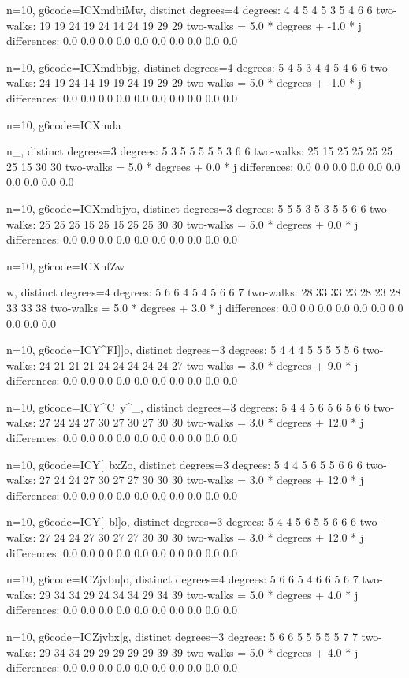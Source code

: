 {{{{{{{{{{{{n=10, g6code=ICXmdbiMw, distinct degrees=4
degrees: 4 4 5 4 5 3 5 4 6 6 
two-walks: 19 19 24 19 24 14 24 19 29 29 
two-walks = 5.0 * degrees + -1.0 * j
differences: 0.0 0.0 0.0 0.0 0.0 0.0 0.0 0.0 0.0 0.0 

n=10, g6code=ICXmdbbjg, distinct degrees=4
degrees: 5 4 5 3 4 4 5 4 6 6 
two-walks: 24 19 24 14 19 19 24 19 29 29 
two-walks = 5.0 * degrees + -1.0 * j
differences: 0.0 0.0 0.0 0.0 0.0 0.0 0.0 0.0 0.0 0.0 

n=10, g6code=ICXmda}n_, distinct degrees=3
degrees: 5 3 5 5 5 5 5 3 6 6 
two-walks: 25 15 25 25 25 25 25 15 30 30 
two-walks = 5.0 * degrees + 0.0 * j
differences: 0.0 0.0 0.0 0.0 0.0 0.0 0.0 0.0 0.0 0.0 

n=10, g6code=ICXmdbjyo, distinct degrees=3
degrees: 5 5 5 3 5 3 5 5 6 6 
two-walks: 25 25 25 15 25 15 25 25 30 30 
two-walks = 5.0 * degrees + 0.0 * j
differences: 0.0 0.0 0.0 0.0 0.0 0.0 0.0 0.0 0.0 0.0 

n=10, g6code=ICXnfZw{w, distinct degrees=4
degrees: 5 6 6 4 5 4 5 6 6 7 
two-walks: 28 33 33 23 28 23 28 33 33 38 
two-walks = 5.0 * degrees + 3.0 * j
differences: 0.0 0.0 0.0 0.0 0.0 0.0 0.0 0.0 0.0 0.0 

n=10, g6code=ICY^FI]]o, distinct degrees=3
degrees: 5 4 4 4 5 5 5 5 5 6 
two-walks: 24 21 21 21 24 24 24 24 24 27 
two-walks = 3.0 * degrees + 9.0 * j
differences: 0.0 0.0 0.0 0.0 0.0 0.0 0.0 0.0 0.0 0.0 

n=10, g6code=ICY^C~y^_, distinct degrees=3
degrees: 5 4 4 5 6 5 6 5 6 6 
two-walks: 27 24 24 27 30 27 30 27 30 30 
two-walks = 3.0 * degrees + 12.0 * j
differences: 0.0 0.0 0.0 0.0 0.0 0.0 0.0 0.0 0.0 0.0 

n=10, g6code=ICY[~bxZo, distinct degrees=3
degrees: 5 4 4 5 6 5 5 6 6 6 
two-walks: 27 24 24 27 30 27 27 30 30 30 
two-walks = 3.0 * degrees + 12.0 * j
differences: 0.0 0.0 0.0 0.0 0.0 0.0 0.0 0.0 0.0 0.0 

n=10, g6code=ICY[~bl]o, distinct degrees=3
degrees: 5 4 4 5 6 5 5 6 6 6 
two-walks: 27 24 24 27 30 27 27 30 30 30 
two-walks = 3.0 * degrees + 12.0 * j
differences: 0.0 0.0 0.0 0.0 0.0 0.0 0.0 0.0 0.0 0.0 

n=10, g6code=ICZjvbu|o, distinct degrees=4
degrees: 5 6 6 5 4 6 6 5 6 7 
two-walks: 29 34 34 29 24 34 34 29 34 39 
two-walks = 5.0 * degrees + 4.0 * j
differences: 0.0 0.0 0.0 0.0 0.0 0.0 0.0 0.0 0.0 0.0 

n=10, g6code=ICZjvbx|g, distinct degrees=3
degrees: 5 6 6 5 5 5 5 5 7 7 
two-walks: 29 34 34 29 29 29 29 29 39 39 
two-walks = 5.0 * degrees + 4.0 * j
differences: 0.0 0.0 0.0 0.0 0.0 0.0 0.0 0.0 0.0 0.0 

}}}}}}}}}}}}
